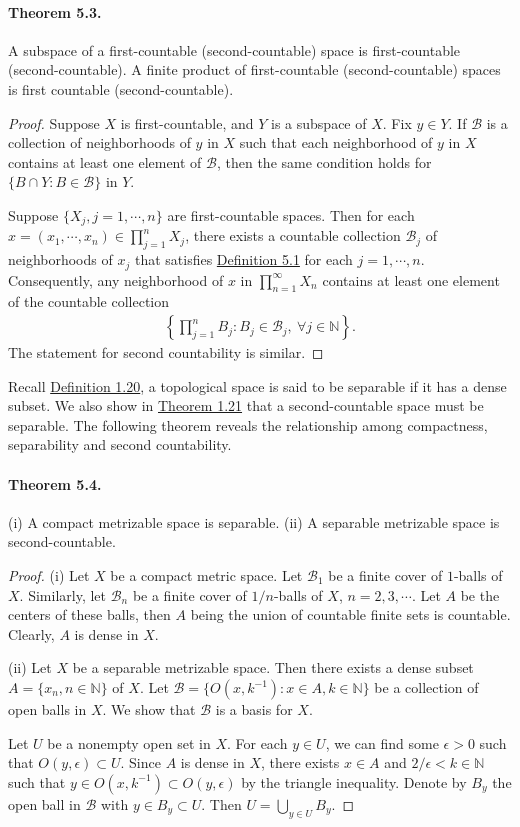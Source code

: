 \documentclass{article}
\numberwithin{equation}{section}
\theoremstyle{plain}
\theoremstyle{definition}
\begin{document}
\paragraph{Theorem 5.3.\label{thm:5.3}} A subspace of a first-countable (second-countable) space is first-countable (second-countable). A finite product of first-countable (second-countable) spaces is first countable (second-countable).
\begin{proof}
Suppose $X$ is first-countable, and $Y$ is a subspace of $X$. Fix $y\in Y$. If $\mathscr{B}$ is a collection of neighborhoods of $y$ in $X$ such that each neighborhood of $y$ in $X$ contains at least one element of $\mathscr{B}$, then the same condition holds for $\{B\cap Y:B\in\mathscr{B}\}$ in $Y$. 

Suppose $\{X_j,j=1,\cdots,n\}$ are first-countable spaces. Then for each $x=(x_1,\cdots,x_n)\in\prod_{j=1}^n X_j$, there exists a countable collection $\mathscr{B}_j$ of neighborhoods of $x_j$ that satisfies \hyperref[def:5.1]{Definition 5.1} for each $j=1,\cdots,n$. Consequently, any neighborhood of $x$ in $\prod_{n=1}^\infty X_n$ contains at least one element of the countable collection
\begin{align*}
	\left\{\prod_{j=1}^n B_j:B_j\in\mathscr{B}_j,\ \forall j\in\mathbb{N}\right\}.
\end{align*}
The statement for second countability is similar.
\end{proof}

Recall \hyperref[def:1.20]{Definition 1.20}, a topological space is said to be separable if it has a dense subset. We also show in \hyperref[thm:1.21]{Theorem 1.21} that a second-countable space must be separable. The following theorem reveals the relationship among compactness, separability and second countability.

\paragraph{Theorem 5.4.\label{thm:5.4}} (i) A compact metrizable space is separable. (ii) A separable metrizable space is second-countable.
\begin{proof}
(i) Let $X$ be a compact metric space. Let $\mathscr{B}_1$ be a finite cover of $1$-balls of $X$. Similarly, let $\mathscr{B}_n$ be a finite cover of $1/n$-balls of $X$, $n=2,3,\cdots$. Let $A$ be the centers of these balls, then $A$ being the union of countable finite sets is countable. Clearly, $A$ is dense in $X$.

(ii) Let $X$ be a separable metrizable space. Then there exists a dense subset $A=\{x_n,n\in\mathbb{N}\}$ of $X$. Let $\mathscr{B}=\{O(x,k^{-1}):x\in A,k\in\mathbb{N}\}$ be a collection of open balls in $X$. We show that $\mathscr{B}$ is a basis for $X$.

Let $U$ be a nonempty open set in $X$. For each $y\in U$, we can find some $\epsilon > 0$ such that $O(y,\epsilon)\subset U$. Since $A$ is dense in $X$, there exists $x\in A$ and $2/\epsilon < k\in\mathbb{N}$ such that $y\in O(x,k^{-1})\subset O(y,\epsilon)$ by the triangle inequality. Denote by $B_y$ the open ball in $\mathscr{B}$ with $y\in B_y\subset U$. Then $U = \bigcup_{y\in U}B_y$.
\end{proof}
\end{document}

